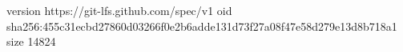 version https://git-lfs.github.com/spec/v1
oid sha256:455c31ecbd27860d03266f0e2b6adde131d73f27a08f47e58d279e13d8b718a1
size 14824

